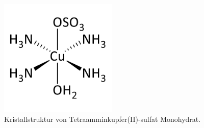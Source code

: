 \documentclass[12pt,a4paper]{scrartcl}
\begin{document}
\begin{figure}[htbp] %
  \centering
  \includegraphics[width=0.5\textwidth]{images/crystal-cell.png}
  \caption{Kristallstruktur von Tetraamminkupfer(II)-sulfat Monohydrat.}
  \label{fig:struktur}
\end{figure} %

\newpage
\printbibliography
\end{document}
